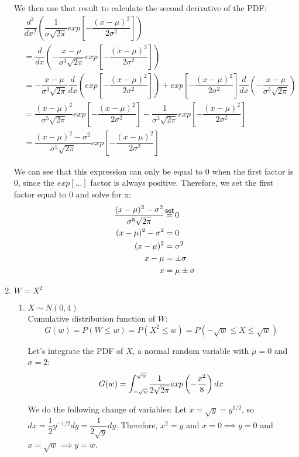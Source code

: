 \documentclass{article}
\newcommand\seteq{\mathrel{\overset{\makebox[0pt]{\mbox{\normalfont\small\sffamily set}}}{=}}}
\begin{document}
\begin{enumerate}
      We then use that result to calculate the second derivative of the PDF:
	\begin{align*}
	 &\dfrac{d^2}{dx^2}\left(\dfrac{1}{\sigma \sqrt{2\pi}} exp\left[-\dfrac{(x-\mu)^2}{2\sigma^2}\right]\right) \\
	  &= \dfrac{d}{dx}\left(-\dfrac{x-\mu}{\sigma^3\sqrt{2\pi}} exp\left[-\dfrac{(x-\mu)^2}{2\sigma^2}\right]\right) \\
	  &= -\dfrac{x-\mu}{\sigma^3\sqrt{2\pi}} \dfrac{d}{dx}\left(exp\left[-\dfrac{(x-\mu)^2}{2\sigma^2}\right]\right)
	      + exp\left[-\dfrac{(x-\mu)^2}{2\sigma^2}\right] \dfrac{d}{dx}\left(-\dfrac{x-\mu}{\sigma^3\sqrt{2\pi}}\right) \\
	  &= \dfrac{(x-\mu)^2}{\sigma^5\sqrt{2\pi}} exp\left[-\dfrac{(x-\mu)^2}{2\sigma^2}\right] 
	      - \dfrac{1}{\sigma^3 \sqrt{2\pi}} exp\left[-\dfrac{(x-\mu)^2}{2\sigma^2}\right] \\
	  &= \dfrac{(x-\mu)^2 - \sigma^2}{\sigma^5\sqrt{2\pi}} exp\left[-\dfrac{(x-\mu)^2}{2\sigma^2}\right]
	\end{align*}

      We can see that this expression can only be equal to 0 when the first factor is 0,
      since the $exp[...]$ factor is always positive. Therefore, we set the first factor
      equal to 0 and solve for x:
	\begin{align*}
	 \dfrac{(x-\mu)^2 - \sigma^2}{\sigma^5\sqrt{2\pi}} &\seteq 0 \\
	 (x-\mu)^2 - \sigma^2 &= 0 \\
	 (x - \mu)^2 &= \sigma^2 \\
	 x - \mu &= \pm \sigma \\
	 x &= \mu \pm \sigma
	\end{align*}
     
     \item
      $W = X^2$
      \begin{enumerate}
       \item 
	$X \sim N(0,4)$ \\
	Cumulative distribution function of $W$:
	$$G(w) = P(W \le w) = P(X^2 \le w) = P(-\sqrt{w} \le X \le \sqrt{w})$$
	
	Let's integrate the PDF of $X$, a normal random variable with $\mu = 0$ and $\sigma = 2$:
	$$G(w) = \mathlarger{\int}_{-\sqrt{w}}^{\sqrt{w}}
	  {\dfrac{1}{2\sqrt{2\pi}}exp\left(-\dfrac{x^2}{8}\right)dx}$$
	  
	We do the following change of variables: Let $x = \sqrt{y} = y^{1/2}$, so 
	$dx = \dfrac{1}{2}y^{-1/2}dy = \dfrac{1}{2\sqrt{y}}dy$. Therefore, $x^2 = y$ and
	$x = 0 \implies y = 0$ and $x = \sqrt{w} \implies y = w$.
	

\end{enumerate}
\end{enumerate}
\end{document}
